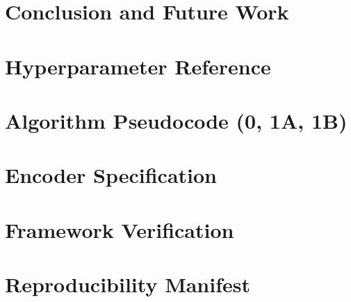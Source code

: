 \documentclass[journal, twocolumn]{IEEEtran}
\begin{document}
\section{Conclusion and Future Work}
\label{sec:conclusion}







\appendices

\section{Hyperparameter Reference}
\label{app:hyperparameters}


\section{Algorithm Pseudocode (0, 1A, 1B)}
\label{app:algorithms}


\section{Encoder Specification}
\label{app:encoders}


\section{Framework Verification}
\label{app:verification}


\section{Reproducibility Manifest}
\label{app:reproducibility}


\balance
\end{document}
